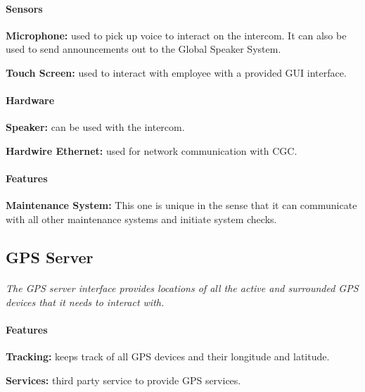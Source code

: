 \documentclass[12pt]{article}
\begin{document}
	\paragraph{Sensors}
	\begin{list}{}{}
		\item \textbf{Microphone: }used to pick up voice to interact on the intercom. It can also be used to send announcements out to the Global Speaker System.
		\item \textbf{Touch Screen: }used to interact with employee with a provided GUI interface.
	\end{list}
		
	\paragraph{Hardware}
	\begin{list}{}{}
		\item \textbf{Speaker: }can be used with the intercom.
		\item \textbf{Hardwire Ethernet: }used for network communication with CGC. 
	\end{list}
	
	\paragraph{Features}
	\begin{list}{}{}
		\item \textbf{Maintenance System: }This one is unique in the sense that it can communicate with all other maintenance systems and initiate system checks. 
	\end{list}

	\subsection{GPS Server}
	\paragraph{} \textit{The GPS server interface provides locations of all the active and surrounded GPS devices that it needs to interact with. }		
	
	\paragraph{Features}
	\begin{list}{}{}
		\item \textbf{Tracking: }keeps track of all GPS devices and their longitude and latitude.
        \item \textbf{Services: }third party service to provide GPS services. 
	\end{list}
\end{document}
